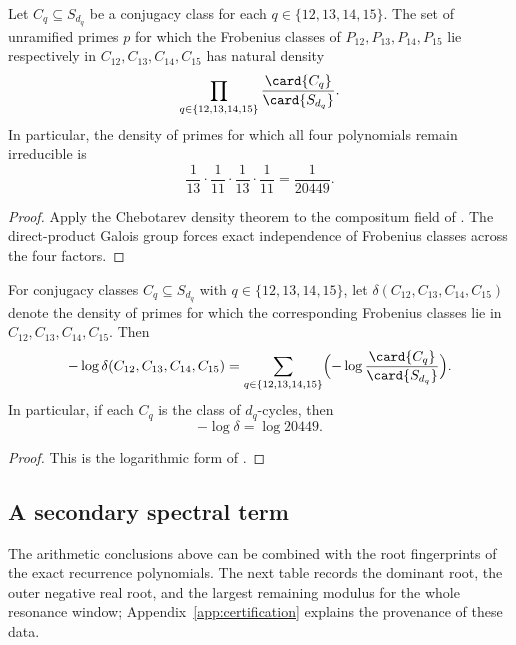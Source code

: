 \begin{corollary}
\label{cor:chebotarev-product}
Let \(C_q\subseteq S_{d_q}\) be a conjugacy class for each
\(q\in\{12,13,14,15\}\).  The set of unramified primes \(p\) for which the
Frobenius classes of \(P_{12},P_{13},P_{14},P_{15}\) lie respectively in
\(C_{12},C_{13},C_{14},C_{15}\) has natural density
\[
  \prod_{q\in\{12,13,14,15\}}\frac{\card{C_q}}{\card{S_{d_q}}}.
\]
In particular, the density of primes for which all four polynomials remain
irreducible is
\[
  \frac{1}{13}\cdot\frac{1}{11}\cdot\frac{1}{13}\cdot\frac{1}{11}
  =\frac{1}{20449}.
\]
\end{corollary}

\begin{proof}
Apply the Chebotarev density theorem to the compositum field of
.  The direct-product Galois group forces exact
independence of Frobenius classes across the four factors.
\end{proof}

\begin{corollary}
\label{cor:log-density-additivity}
For conjugacy classes \(C_q\subseteq S_{d_q}\) with \(q\in\{12,13,14,15\}\),
let \(\delta(C_{12},C_{13},C_{14},C_{15})\) denote the density of primes for
which the corresponding Frobenius classes lie in
\(C_{12},C_{13},C_{14},C_{15}\).  Then
\[
  -\log \delta(C_{12},C_{13},C_{14},C_{15})
  =
  \sum_{q\in\{12,13,14,15\}}
  \Bigl(-\log \frac{\card{C_q}}{\card{S_{d_q}}}\Bigr).
\]
In particular, if each \(C_q\) is the class of \(d_q\)-cycles, then
\[
  -\log \delta = \log 20449.
\]
\end{corollary}

\begin{proof}
This is the logarithmic form of .
\end{proof}

\subsection{A secondary spectral term}

The arithmetic conclusions above can be combined with the root fingerprints of
the exact recurrence polynomials.  The next table records the dominant root,
the outer negative real root, and the largest remaining modulus for the whole
resonance window; Appendix~\ref{app:certification} explains the provenance of
these data.

